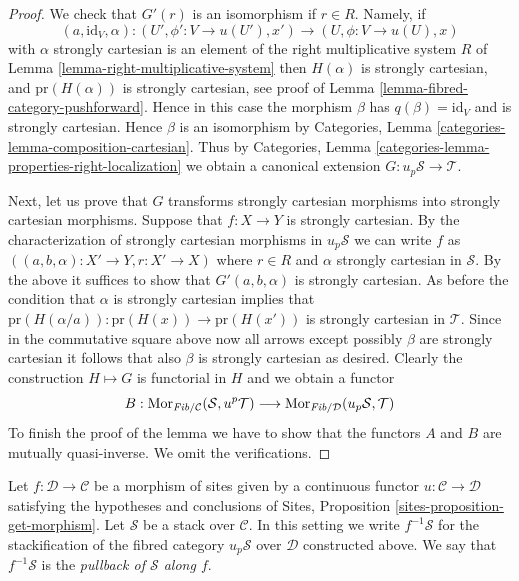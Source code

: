 \begin{proof}
\medskip\noindent
We check that $G'(r)$ is an isomorphism if $r \in R$.
Namely, if
$$
(a, \text{id}_V, \alpha) :
(U', \phi' : V \to u(U'), x')
\longrightarrow
(U, \phi : V \to u(U), x)
$$
with $\alpha$ strongly cartesian is an element of the right multiplicative
system $R$ of
Lemma \ref{lemma-right-multiplicative-system}
then $H(\alpha)$ is strongly cartesian, and
$\text{pr}(H(\alpha))$ is strongly cartesian, see proof of
Lemma \ref{lemma-fibred-category-pushforward}.
Hence in this case the morphism $\beta$ has $q(\beta) = \text{id}_V$
and is strongly cartesian. Hence $\beta$ is an isomorphism by
Categories, Lemma \ref{categories-lemma-composition-cartesian}.
Thus by
Categories, Lemma \ref{categories-lemma-properties-right-localization}
we obtain a canonical extension $G : u_p\mathcal{S} \to \mathcal{T}$.

\medskip\noindent
Next, let us prove that $G$ transforms strongly cartesian morphisms
into strongly cartesian morphisms.
Suppose that $f : X \to Y$ is strongly cartesian. By the characterization
of strongly cartesian morphisms in $u_p\mathcal{S}$ we can write $f$ as
$((a, b, \alpha) : X' \to Y, r : X' \to X)$ where $r \in R$ and
$\alpha$ strongly cartesian in $\mathcal{S}$. By the above it suffices
to show that $G'(a, b, \alpha)$ is strongly cartesian. As before
the condition that $\alpha$ is strongly cartesian implies that
$\text{pr}(H(\alpha/a)) : \text{pr}(H(x)) \to \text{pr}(H(x'))$
is strongly cartesian in $\mathcal{T}$. Since in the commutative
square above now all arrows except possibly $\beta$ are strongly cartesian
it follows that also $\beta$ is strongly cartesian as desired.
Clearly the construction $H \mapsto G$ is functorial in $H$ and we
obtain a functor
$$
B :
\mathop{\mathrm{Mor}}\nolimits_{\textit{Fib}/\mathcal{C}}(\mathcal{S}, u^p\mathcal{T})
\longrightarrow
\mathop{\mathrm{Mor}}\nolimits_{\textit{Fib}/\mathcal{D}}(u_p\mathcal{S}, \mathcal{T})
$$
To finish the proof of the lemma we have to show that the functors
$A$ and $B$ are mutually quasi-inverse. We omit the verifications.
\end{proof}

\begin{definition}
\label{definition-pullback-stack}
Let $f : \mathcal{D} \to \mathcal{C}$ be a morphism of sites
given by a continuous functor $u : \mathcal{C} \to \mathcal{D}$
satisfying the hypotheses and conclusions of
Sites, Proposition \ref{sites-proposition-get-morphism}.
Let $\mathcal{S}$ be a stack over $\mathcal{C}$.
In this setting we write {\it $f^{-1}\mathcal{S}$} for the stackification
of the fibred category $u_p\mathcal{S}$ over $\mathcal{D}$ constructed
above. We say that $f^{-1}\mathcal{S}$ is the
{\it pullback of $\mathcal{S}$ along $f$}.
\end{definition}

